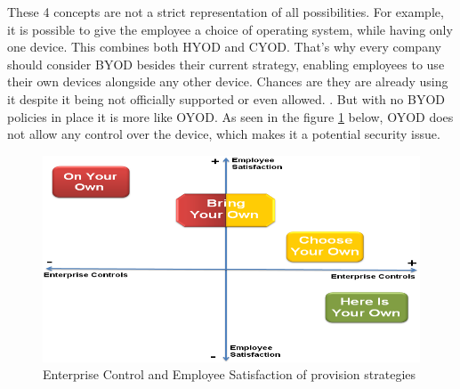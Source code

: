These 4 concepts are not a strict representation of all possibilities. For example, it is possible to give the employee a choice of operating system, while having only one device. This combines both HYOD and CYOD. That's why every company should consider BYOD besides their current strategy, enabling employees to use their own devices alongside any other device. Chances are they are already using it despite it being not officially supported or even allowed. \parencite{IBMSecurity.2016}. But with no BYOD policies in place it is more like OYOD. As seen in the figure \ref{fig:control_v_satisfaction} below, OYOD does not allow any control over the device, which makes it a potential security issue.
\begin{figure}[H]
\includegraphics[width=0.7\linewidth]{images/control_v_satisfaction}
\caption{Enterprise Control and Employee Satisfaction of provision strategies \parencite{KumarGajar.2013}}
\label{fig:control_v_satisfaction}
\end{figure}

